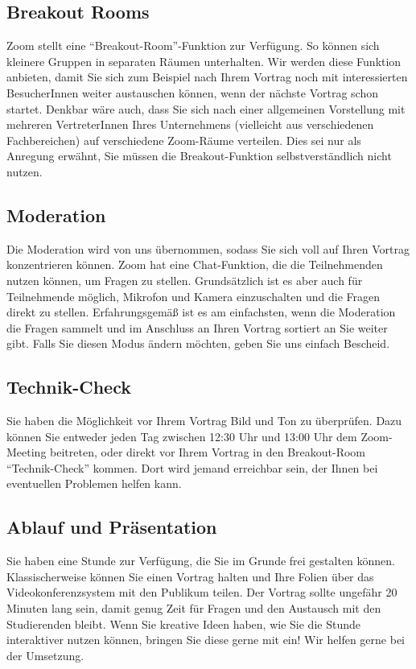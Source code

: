 \documentclass[
  paper=a4,
  fontsize=12pt,
  DIV=16,
  headheight=30pt,
  footheight=45pt,
  headinclude,
  parskip=half,
]{scrartcl}
\begin{document}
\subsection*{Breakout Rooms}
Zoom stellt eine \enquote{Breakout-Room}-Funktion zur Verfügung.
So können sich kleinere Gruppen in separaten Räumen unterhalten.
Wir werden diese Funktion anbieten, damit Sie sich zum Beispiel nach Ihrem Vortrag noch mit interessierten BesucherInnen weiter austauschen können, wenn der nächste Vortrag schon startet.
Denkbar wäre auch, dass Sie sich nach einer allgemeinen Vorstellung mit mehreren VertreterInnen Ihres Unternehmens (vielleicht aus verschiedenen Fachbereichen) auf verschiedene Zoom-Räume verteilen.
Dies sei nur als Anregung erwähnt, Sie müssen die Breakout-Funktion selbstverständlich nicht nutzen.

\subsection*{Moderation}
Die Moderation wird von uns übernommen, sodass Sie sich voll auf Ihren Vortrag konzentrieren können.
Zoom hat eine Chat-Funktion, die die Teilnehmenden nutzen können, um Fragen zu stellen.
Grundsätzlich ist es aber auch für Teilnehmende möglich, Mikrofon und Kamera einzuschalten und die Fragen direkt zu stellen.
Erfahrungsgemäß ist es am einfachsten, wenn die Moderation die Fragen sammelt und im Anschluss an Ihren Vortrag sortiert an Sie weiter gibt.
Falls Sie diesen Modus ändern möchten, geben Sie uns einfach Bescheid.


\subsection*{Technik-Check}
Sie haben die Möglichkeit vor Ihrem Vortrag Bild und Ton zu überprüfen.
Dazu können Sie entweder jeden Tag zwischen 12:30 Uhr und 13:00 Uhr dem Zoom-Meeting beitreten, oder direkt vor Ihrem Vortrag in den Breakout-Room \enquote{Technik-Check} kommen.
Dort wird jemand erreichbar sein, der Ihnen bei eventuellen Problemen helfen kann.


\subsection*{Ablauf und Präsentation}
Sie haben eine Stunde zur Verfügung, die Sie im Grunde frei gestalten können.
Klassischerweise können Sie einen Vortrag halten und Ihre Folien über das Videokonferenzsystem mit den Publikum teilen.
Der Vortrag sollte ungefähr 20 Minuten lang sein, damit genug Zeit für Fragen und den Austausch mit den Studierenden bleibt.
Wenn Sie kreative Ideen haben, wie Sie die Stunde interaktiver nutzen können, bringen Sie diese gerne mit ein!
Wir helfen gerne bei der Umsetzung.
\end{document}
